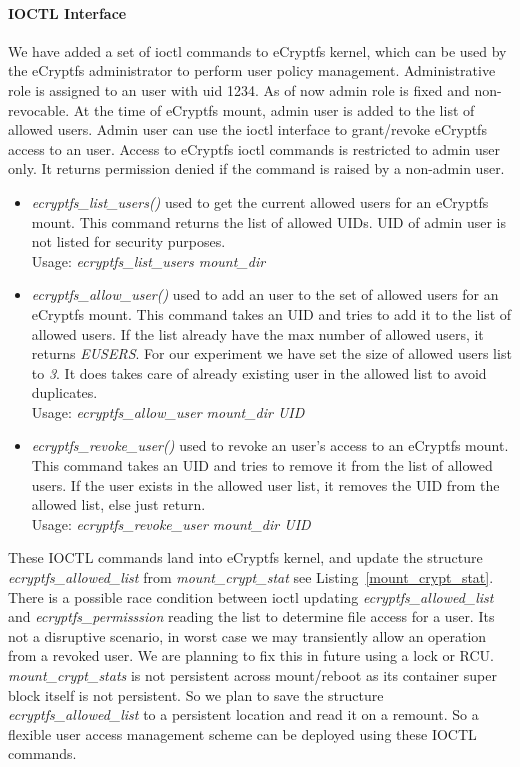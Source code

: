 \paragraph{IOCTL Interface}
We have added a set of ioctl commands to eCryptfs kernel, which can be
used by the eCryptfs administrator to perform user policy management.
Administrative role is assigned to an user with uid \mbox{1234}.  As
of now admin role is fixed and non-revocable.  At the time of eCryptfs
mount, admin user is added to the list of allowed users.  Admin user
can use the ioctl interface to grant/revoke eCryptfs access to an
user.  Access to eCryptfs ioctl commands is restricted to admin user
only.  It returns permission denied if the command is raised by a
non-admin user.
\begin{itemize}[leftmargin=*]
\item
\emph{ecryptfs\_list\_users()} used to get the current allowed users
for an eCryptfs mount.  This command returns the list of allowed UIDs.
UID of admin user is not listed for security purposes.\\
Usage: \emph{ecryptfs\_list\_users mount\_dir}
\item
\emph{ecryptfs\_allow\_user()} used to add an user to the set of
allowed users for an eCryptfs mount.  This command takes an UID and
tries to add it to the list of allowed users.  If the list already
have the max number of allowed users, it returns \emph{EUSERS}.  For
our experiment we have set the size of allowed users list to \emph{3}.
It does takes care of already existing user in the allowed list to
avoid duplicates.\\
Usage: \emph{ecryptfs\_allow\_user mount\_dir UID}
\item
\emph{ecryptfs\_revoke\_user()} used to revoke an user's access to an
eCryptfs mount.  This command takes an UID and tries to remove it from
the list of allowed users.  If the user exists in the allowed user
list, it removes the UID from the allowed list, else just return.\\
Usage: \emph{ecryptfs\_revoke\_user mount\_dir UID}
\end{itemize}

These IOCTL commands land into eCryptfs kernel, and update the
structure \emph{ecryptfs\_allowed\_list} from
\emph{mount\_crypt\_stat} see Listing~\ref{mount_crypt_stat}.  There
is a possible race condition between ioctl updating
\emph{ecryptfs\_allowed\_list} and \emph{ecryptfs\_permisssion}
reading the list to determine file access for a user.  Its not a
disruptive scenario, in worst case we may transiently allow an
operation from a revoked user.  We are planning to fix this in future
using a lock or RCU.  \emph{mount\_crypt\_stats} is not persistent
across mount/reboot as its container super block itself is not
persistent.  So we plan to save the structure
\emph{ecryptfs\_allowed\_list} to a persistent location and read it on
a remount.  So a flexible user access management scheme can be
deployed using these IOCTL commands.


